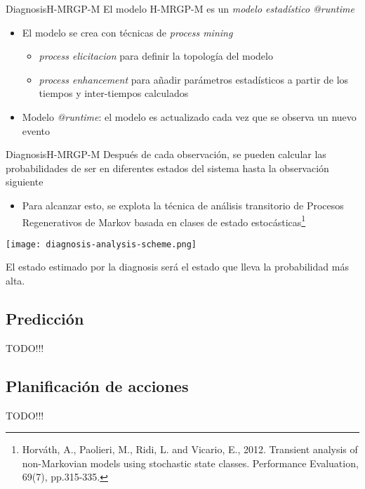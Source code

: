 \documentclass[9pt, handout]{beamer}
\begin{document}
      \begin{frame}{Diagnosis}{H-MRGP-M}
        El modelo H-MRGP-M es un \textit{modelo estadístico @runtime}
        \begin{itemize}
          \item El modelo se crea con técnicas de \textit{process mining}
          \begin{itemize}
            \item \textit{process elicitacion} para definir la topología del modelo
            \item \textit{process enhancement} para añadir parámetros estadísticos a partir de los tiempos y inter-tiempos calculados
          \end{itemize}
          \item Modelo \textit{@runtime}: el modelo es actualizado cada vez que se observa un nuevo evento
        \end{itemize}
      \end{frame}
      
      \begin{frame}{Diagnosis}{H-MRGP-M}
        Después de cada observación, se pueden calcular las probabilidades de ser en diferentes estados del sistema hasta la observación siguiente
        \begin{itemize}
          \item Para alcanzar esto, se explota la técnica de análisis transitorio de Procesos Regenerativos de Markov basada en clases de estado estocásticas\footnote{Horváth, A., Paolieri, M., Ridi, L. and Vicario, E., 2012. Transient analysis of non-Markovian models using stochastic state classes. Performance Evaluation, 69(7), pp.315-335.}
        \end{itemize}
        
        \begin{center}
          \texttt{[image: diagnosis-analysis-scheme.png]}
        \end{center}
        
        El estado estimado por la diagnosis será el estado que lleva la probabilidad más alta.
      \end{frame}
      
    \subsection{Predicción}
      \begin{frame}{TODO!!!}
      \end{frame}
      
    \subsection{Planificación de acciones}
      \begin{frame}{TODO!!!}
      \end{frame}
\end{document}
